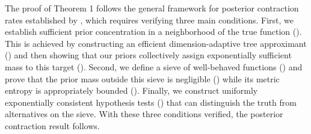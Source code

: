 \documentclass[11pt]{article}
\theoremstyle{plain}
\theoremstyle{definition}
\theoremstyle{plain}
\begin{document}
The proof of Theorem 1 follows the general framework for posterior contraction rates established by \citet{Ghosal2000}, which requires verifying three main conditions. First, we establish sufficient prior concentration in a neighborhood of the true function (). This is achieved by constructing an efficient dimension-adaptive tree approximant () and then showing that our priors collectively assign exponentially sufficient mass to this target (). Second, we define a sieve of well-behaved functions () and prove that the prior mass outside this sieve is negligible () while its metric entropy is appropriately bounded (). Finally, we construct uniformly exponentially consistent hypothesis tests () that can distinguish the truth from alternatives on the sieve. With these three conditions verified, the posterior contraction result follows.
\end{document}
